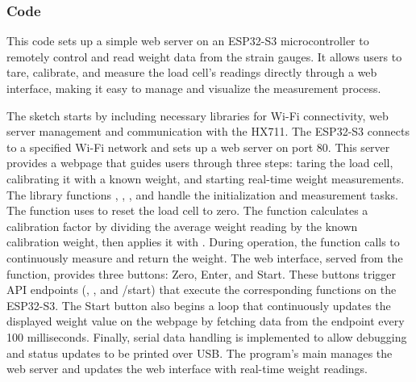 \subsubsection{Code}
This code sets up a simple web server on an ESP32-S3 microcontroller to remotely control and read weight data from the strain gauges. It allows users to tare, calibrate, and measure the load cell’s readings directly through a web interface, making it easy to manage and visualize the measurement process.




The sketch starts by including necessary libraries for Wi-Fi connectivity, web server management and communication with the HX711. The ESP32-S3 connects to a specified Wi-Fi network and sets up a web server on port 80. This server provides a webpage that guides users through three steps: taring the load cell, calibrating it with a known weight, and starting real-time weight measurements. The library functions , , , and  handle the initialization and measurement tasks. The  function uses  to reset the load cell to zero. The  function calculates a calibration factor by dividing the average weight reading by the known calibration weight, then applies it with . During operation, the function calls  to continuously measure and return the weight. The web interface, served from the function, provides three buttons: Zero, Enter, and Start. These buttons trigger API endpoints (, , and /start) that execute the corresponding functions on the ESP32-S3. The Start button also begins a loop that continuously updates the displayed weight value on the webpage by fetching data from the endpoint every 100 milliseconds. Finally, serial data handling is implemented to allow debugging and status updates to be printed over USB. The program’s main  manages the web server and updates the web interface with real-time weight readings.


